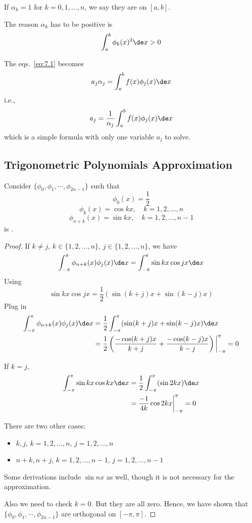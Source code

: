 If $\alpha_k = 1$ for $k=0,1,\dots,n$, we say they are  on $[a,b]$.
\begin{note}
    The reason $\alpha_k$ has to be positive is \[
        \int_a^b \phi_k(x)^2 \de x > 0
    \]
\end{note}

The eqs.~\ref{eq:7.1} becomes \[
    a_j \alpha_j = \int_a^b f(x) \phi_j(x) \de x
\]
i.e., \[
    a_j = \frac{1}{\alpha_j} \int_a^b f(x) \phi_j(x) \de x
\]
which is a simple formula with only one variable $a_j$ to solve.

\subsection{Trigonometric Polynomials Approximation}

\begin{theorem}
    Consider $\{\phi_0, \phi_1, \cdots, \phi_{2n-1}\}$ such that \[
        \phi_0(x) = \frac{1}{2}
    \]
    \[
        \phi_k(x) = \cos kx, \quad k=1,2,\dots,n
    \]
    \[
        \phi_{n+k}(x) = \sin kx, \quad k=1,2,\dots,n-1
    \]
    is .
\end{theorem}
\begin{proof}
    If $k \neq j$, $k \in \{1,2,\dots,n\}$, $j \in \{1,2,\dots,n\}$, we have \[
        \int_{-\pi}^\pi \phi_{n+k}(x) \phi_{j}(x) \de x = \int_{-\pi}^\pi \sin kx \cos jx \de x
    \]
    Using \[
        \sin kx \cos jx = \frac{1}{2} (\sin (k+j)x + \sin (k-j)x)
    \]
    Plug in
    \begin{align*}
        \int_{-\pi}^\pi \phi_{n+k}(x) \phi_{j}(x) \de x &= \frac{1}{2} \int_{-\pi}^\pi (\sin (k+j)x + \sin (k-j)x) \de x \\
        &= \frac{1}{2} \left( \frac{-\cos (k+j)x}{k+j} + \frac{-\cos (k-j)x}{k-j} \right) \bigg\vert_{-\pi}^\pi = 0
    \end{align*}
    
    If $k = j$, \begin{align*}
        \int_{-\pi}^\pi \sin kx \cos kx \de x & = \frac{1}{2} \int_{-\pi}^\pi (\sin 2kx) \de x \\
        &= \frac{-1}{4k} \cos 2kx \bigg\vert_{-\pi}^\pi = 0
    \end{align*}
    
    There are two other cases:
    \begin{itemize}
        \item $k, j$, $k = 1, 2, \dots, n$, $j = 1, 2, \dots, n$
        \item $n + k, n + j$, $k = 1, 2, \dots, n-1$, $j = 1, 2, \dots, n-1$
    \end{itemize}

    \begin{note}
        Some derivations include $\sin nx$ as well, though it is not necessary for the approximation.
    \end{note}

    Also we need to check $k = 0$. But they are all zero. Hence, we have shown that $\{\phi_0, \phi_1, \cdots, \phi_{2n-1}\}$ are orthogonal on $[-\pi, \pi]$.
\end{proof}

